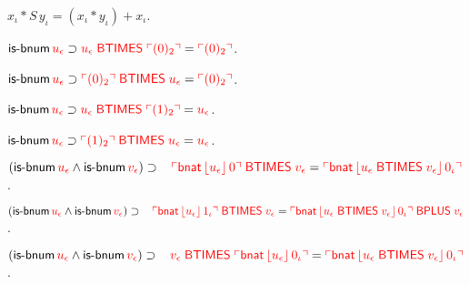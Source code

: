 \begin{biformthy}
    \item $x_\iota * S \, y_\iota = (x_\iota * y_\iota) + x_\iota$.

    \item $\mbox{\sf is-bnum} \, \textcolor{red}{u_\epsilon} \supset
      \textcolor{red}{u_\epsilon \; \mbox{\sf BTIMES} \; \ulcorner(0)_2\urcorner} =
      \textcolor{red}{\ulcorner(0)_2\urcorner}$.

    \item $\mbox{\sf is-bnum} \, \textcolor{red}{u_\epsilon} \supset \textcolor{red}{
      \ulcorner(0)_2\urcorner \; \mbox{\sf BTIMES} \; u_\epsilon} =
      \textcolor{red}{\ulcorner(0)_2\urcorner}$.

    \item $\mbox{\sf is-bnum} \, \textcolor{red}{u_\epsilon} \supset
      \textcolor{red}{u_\epsilon \; \mbox{\sf BTIMES} \; \ulcorner(1)_2\urcorner} =
      \textcolor{red}{u_\epsilon}$.

    \item $\mbox{\sf is-bnum} \, \textcolor{red}{u_\epsilon} \supset
      \textcolor{red}{\ulcorner(1)_2\urcorner \; \mbox{\sf BTIMES} \; u_\epsilon} =
      \textcolor{red}{u_\epsilon}$.

    \item $(\mbox{\sf is-bnum} \, \textcolor{red}{u_\epsilon} \wedge \mbox{\sf is-bnum}
      \, \textcolor{red}{v_\epsilon}) \supset {}\\
        \hspace*{2ex} \textcolor{red}{\ulcorner\mbox{\sf bnat} \,
            \lfloor u_\epsilon\rfloor \, 0\urcorner \; \mbox{\sf BTIMES} \;
          \textcolor{red}{v_\epsilon}} = \textcolor{red}{\ulcorner\mbox{\sf bnat} \,
            \lfloor u_\epsilon \; \mbox{\sf BTIMES} \; v_\epsilon\rfloor \,
            0_\iota\urcorner}$.

    \item $(\mbox{\sf is-bnum} \, \textcolor{red}{u_\epsilon} \wedge \mbox{\sf is-bnum}
      \, \textcolor{red}{v_\epsilon}) \supset {}\\
        \hspace*{2ex} \textcolor{red}{\ulcorner\mbox{\sf bnat} \,
            \lfloor u_\epsilon\rfloor \, 1_\iota\urcorner \; \mbox{\sf BTIMES} \;
          \textcolor{red}{v_\epsilon}} = \textcolor{red}{\ulcorner\mbox{\sf bnat} \,
            \lfloor u_\epsilon \; \mbox{\sf BTIMES} \; v_\epsilon\rfloor \,
            0_\iota\urcorner \; \mbox{\sf BPLUS} \; v_\epsilon}$.

    \item $(\mbox{\sf is-bnum} \, \textcolor{red}{u_\epsilon} \wedge \mbox{\sf is-bnum}
      \, \textcolor{red}{v_\epsilon}) \supset {}\\
        \hspace*{2ex} \textcolor{red}{\textcolor{red}{v_\epsilon}\; \mbox{\sf BTIMES} \;
          \ulcorner\mbox{\sf bnat} \, \lfloor u_\epsilon\rfloor \, 0_\iota\urcorner} =
        \textcolor{red}{\ulcorner\mbox{\sf bnat} \, \lfloor u_\epsilon \;
              \mbox{\sf BTIMES} \; v_\epsilon\rfloor \, 0_\iota\urcorner}$.


\end{biformthy}
